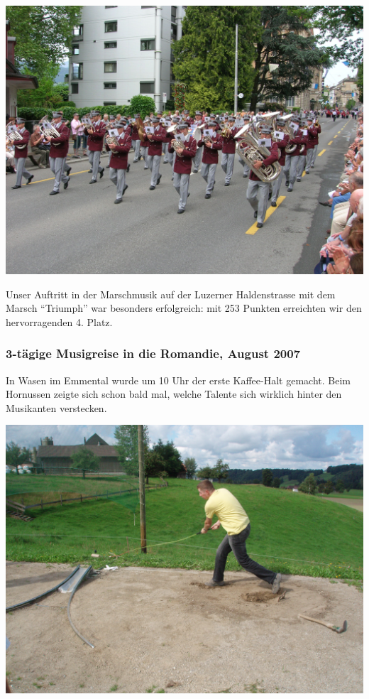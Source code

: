 \begin{history}
    \begin{MulticolFigure}
        \centering
        \includegraphics[width=0.93\linewidth]{./chap/2001-2024/2006/Marschmusik.jpg}
    \end{MulticolFigure}

    Unser Auftritt in der Marschmusik auf der Luzerner Haldenstrasse mit dem
    Marsch \enquote{Triumph} war besonders erfolgreich: mit 253 Punkten
    erreichten wir den hervorragenden 4. Platz.

    \vfill
    \columnbreak

    \subsubsection*{3-tägige Musigreise in die Romandie, August 2007}

    In Wasen im Emmental wurde um 10 Uhr der erste Kaffee-Halt gemacht. Beim
    Hornussen zeigte sich schon bald mal, welche Talente sich wirklich hinter
    den Musikanten verstecken.

    \begin{MulticolFigure}
        \centering
        \includegraphics[width=0.93\linewidth]{./chap/2001-2024/2007/Max-am-Hornussen.JPG}
    \end{MulticolFigure}


\end{history}
